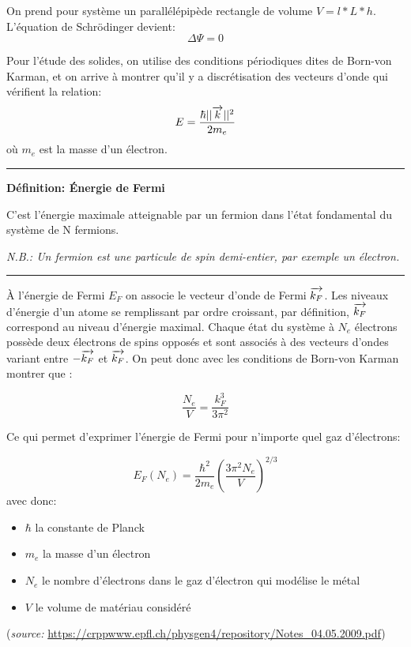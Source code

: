 \documentclass{report}
\begin{document}
On prend pour système un parallélépipède rectangle de volume $V = l*L*h$.
L'équation de Schrödinger devient:
$$\Delta \Psi = 0$$

Pour l'étude des solides, on utilise des conditions périodiques dites de Born-von Karman, et on arrive à montrer qu'il y a discrétisation des vecteurs d'onde qui vérifient la relation:
$$E = \frac{\hbar ||\overrightarrow{k}||^2}{2m_e}$$
où $m_e$ est la masse d'un électron.

\rule{\textwidth}{0.4pt}

\begin{center}
\textbf{Définition: Énergie de Fermi}
    
    C’est l’énergie maximale atteignable par un fermion dans l’état fondamental du système de N fermions.

\emph{N.B.: Un fermion est une particule de spin demi-entier, par exemple un électron.}    
\end{center}

\rule{\textwidth}{0.4pt}

À l'énergie de Fermi $E_F$ on associe le vecteur d'onde de Fermi $\overrightarrow{k_F}$. Les niveaux d'énergie d'un atome se remplissant par ordre croissant, par définition, $\overrightarrow{k_F}$ correspond au niveau d'énergie maximal. Chaque état du système à $N_e$ électrons possède deux électrons de spins opposés et sont associés à des vecteurs d'ondes variant entre $-\overrightarrow{k_F}$ et $\overrightarrow{k_F}$. On peut donc avec les conditions de Born-von Karman montrer que :

$$\frac{N_e}{V} = \frac{k_F^3}{3\pi^2}$$

Ce qui permet d'exprimer l'énergie de Fermi pour n'importe quel gaz d'électrons:


    $$E_F(N_e) = \frac{\hbar^2}{2m_e} \left(\frac{3\pi^2N_e}{V}\right)^{2/3}$$
avec donc:
    \begin{itemize}
        \item $\hbar$ la constante de Planck
        \item $m_e$ la masse d'un électron
        \item $N_e$ le nombre d'électrons dans le gaz d'électron qui modélise le métal
        \item $V$ le volume de matériau considéré
    \end{itemize}
(\emph{source: }\url{https://crppwww.epfl.ch/physgen4/repository/Notes_04.05.2009.pdf})
\end{document}
